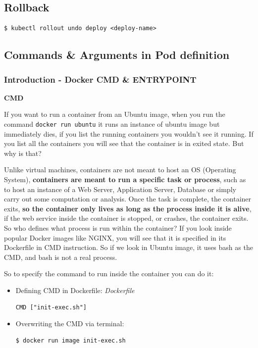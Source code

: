 \documentclass{article}
\newenvironment{codetemplate}[1][]{%
  \mybasecolorbox[#1]
  \itshape
}{%
  \endmybasecolorbox
}
\begin{document}
\subsection{Rollback}
\begin{codetemplate}{}
\begin{verbatim}
$ kubectl rollout undo deploy <deploy-name>
\end{verbatim}
\end{codetemplate}

\subsection{Commands \& Arguments in Pod definition}

\subsubsection{Introduction - Docker CMD \& ENTRYPOINT}

\textbf{CMD}

If you want to run a container from an Ubuntu image, when you run the command \verb|docker run ubuntu| it runs an instance of ubuntu image but immediately dies, if you list the running containers you wouldn't see it running. If you list all the containers you will see that the container is in exited state. But why is that?

Unlike virtual machines, containers are not meant to host an OS (Operating System), \textbf{containers are meant to run a specific task or process}, such as to host an instance of a Web Server, Application Server, Database or simply carry out some computation or analysis. Once the task is complete, the container exits, \textbf{so the container only lives as long as the process inside it is alive}, if the web service inside the container is stopped, or crashes, the container exits. So who defines what process is run within the container? If you look inside popular Docker images like NGINX, you will see that it is specified in its Dockerfile in CMD instruction. So if we look in Ubuntu image, it uses bash as the CMD, and bash is not a real process.

So to specify the command to run inside the container you can do it:

\begin{itemize}
    \item Defining CMD in Dockerfile:
\begin{codetemplate}{Dockerfile}
\begin{verbatim}
CMD ["init-exec.sh"]
\end{verbatim}
\end{codetemplate}

    \item Overwriting the CMD via terminal:
\begin{codetemplate}{}
\begin{verbatim}
$ docker run image init-exec.sh
\end{verbatim}
\end{codetemplate}
\end{itemize}
\end{document}
